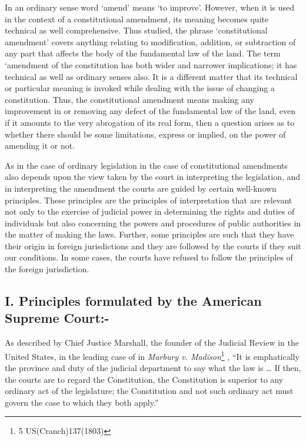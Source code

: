 \begin{multicols}{2}
\noi
In an ordinary sense word ‘amend’ means ‘to improve’. However, when it is
used in the context of a constitutional amendment, its meaning becomes quite technical
as well comprehensive. Thus studied, the phrase ‘constitutional amendment’ covers
anything relating to modification, addition, or subtraction of any part that affects the
body of the fundamental law of the land. The term ‘amendment of the constitution has
both wider and narrower implications; it has technical as well as ordinary senses also.
It is a different matter that its technical or particular meaning is invoked while dealing
with the issue of changing a constitution. Thus, the constitutional amendment means
making any improvement in or removing any defect of the fundamental law of the land,
even if it amounts to the very abrogation of its real form, then a question arises as to
whether there should be some limitations, express or implied, on the power of amending
it or not.

\noi
As in the case of ordinary legislation in the case of constitutional amendments also
depends upon the view taken by the court in interpreting the legislation, and in
interpreting the amendment the courts are guided by certain well-known principles.
These principles are the principles of interpretation that are relevant not only to the
exercise of judicial power in determining the rights and duties of individuals but also
concerning the powers and procedures of public authorities in the matter of making the
laws. Further, some principles are such that they have their origin in foreign
jurisdictions and they are followed by the courts if they suit our conditions. In some
cases, the courts have refused to follow the principles of the foreign jurisdiction.


\vspace{-.4cm}

\subsection*{I. Principles formulated by the American Supreme Court:-}

\noi
As described by Chief Justice Marshall, the founder of the Judicial Review in the United
States, in the leading case of in \textit{Marbury v. Madison}\footnote{5 US(Cranch)137(1803)}
, “It is emphatically the province
and duty of the judicial department to say what the law is … If then, the courts are to
regard the Constitution, the Constitution is superior to any ordinary act of the
legislature; the Constitution and not such ordinary act must govern the case to which
they both apply.”


\end{multicols}
